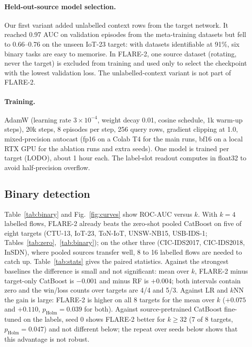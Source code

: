 \documentclass[11pt]{article}
\begin{document}
\paragraph{Held-out-source model selection.}
Our first variant added unlabelled context rows from the target network.
It reached 0.97 AUC on validation episodes from the meta-training datasets but fell to 0.66--0.76 on the unseen IoT-23 target: with datasets identifiable at 91\%, six binary tasks are easy to memorise.
In FLARE-2, one source dataset (rotating, never the target) is excluded from training and used only to select the checkpoint with the lowest validation loss.
The unlabelled-context variant is not part of FLARE-2.

\paragraph{Training.}
AdamW (learning rate $3\times10^{-4}$, weight decay 0.01, cosine schedule, 1k warm-up steps), 20k steps, 8 episodes per step, 256 query rows, gradient clipping at 1.0, mixed-precision autocast (fp16 on a Colab T4 for the main runs, bf16 on a local RTX GPU for the ablation runs and extra seeds).
One model is trained per target (LODO), about 1 hour each.
The label-slot readout computes in float32 to avoid half-precision overflow.

\subsection{Binary detection}
Table~\ref{tab:binary} and Fig.~\ref{fig:curves} show ROC-AUC versus $k$.
With $k=4$ labelled flows, FLARE-2 already beats the zero-shot pooled CatBoost on five of eight targets (CTU-13, IoT-23, ToN-IoT, UNSW-NB15, USB-IDS-1; Tables~\ref{tab:zero},~\ref{tab:binary}); on the other three (CIC-IDS2017, CIC-IDS2018, InSDN), where pooled sources transfer well, 8 to 16 labelled flows are needed to catch up.
Table~\ref{tab:stats} gives the paired statistics.
Against the strongest baselines the difference is small and not significant: mean over $k$, FLARE-2 minus target-only CatBoost is $-0.001$ and minus RF is $+0.004$; both intervals contain zero and the win/loss counts over targets are 4/4 and 5/3.
Against LR and $k$NN the gain is large: FLARE-2 is higher on all 8 targets for the mean over $k$ ($+0.075$ and $+0.110$, $p_{\text{Holm}}=0.039$ for both).
Against source-pretrained CatBoost fine-tuned on the labels, seed 0 shows FLARE-2 better for $k\ge 32$ (7 of 8 targets, $p_{\text{Holm}}=0.047$) and not different below; the repeat over seeds below shows that this advantage is not robust.
\end{document}
